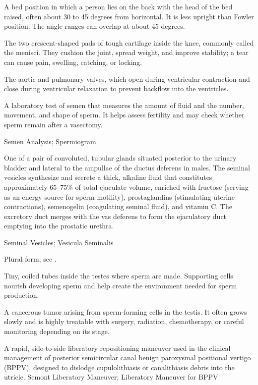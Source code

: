  A bed position in which a person lies on the back with the head of the bed raised, often about 30 to 45 degrees from horizontal. It is less upright than Fowler position. The angle ranges can overlap at about 45 degrees.

 The two crescent-shaped pads of tough cartilage inside the knee, commonly called the menisci. They cushion the joint, spread weight, and improve stability; a tear can cause pain, swelling, catching, or locking.

 The aortic and pulmonary valves, which open during ventricular contraction and close during ventricular relaxation to prevent backflow into the ventricles.

 A laboratory test of semen that measures the amount of fluid and the number, movement, and shape of sperm. It helps assess fertility and may check whether sperm remain after a vasectomy.

\synonyms
Semen Analysis; Spermiogram

 One of a pair of convoluted, tubular glands situated posterior to the urinary bladder and lateral to the ampullae of the ductus deferens in males. The seminal vesicles synthesize and secrete a thick, alkaline fluid that constitutes approximately 65--75\% of total ejaculate volume, enriched with fructose (serving as an energy source for sperm motility), prostaglandins (stimulating uterine contractions), semenogelin (coagulating seminal fluid), and vitamin C. The excretory duct merges with the vas deferens to form the ejaculatory duct emptying into the prostatic urethra.

\synonyms
Seminal Vesicles; Vesicula Seminalis

 Plural form; see .

 Tiny, coiled tubes inside the testes where sperm are made. Supporting cells nourish developing sperm and help create the environment needed for sperm production.

 A cancerous tumor arising from sperm-forming cells in the testis. It often grows slowly and is highly treatable with surgery, radiation, chemotherapy, or careful monitoring depending on its stage.

 A rapid, side-to-side liberatory repositioning maneuver used in the clinical management of posterior semicircular canal benign paroxysmal positional vertigo (BPPV), designed to dislodge cupulolithiasis or canalithiasis debris into the utricle.
\synonyms
Semont Liberatory Maneuver; Liberatory Maneuver for BPPV


